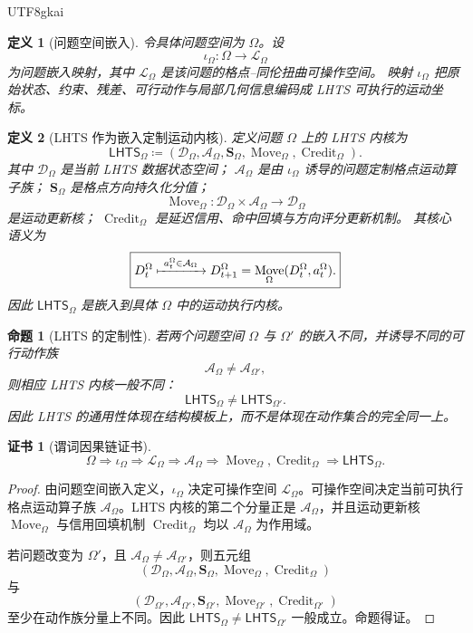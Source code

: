 \documentclass[12pt]{article}
\newtheorem{definition}{定义}[section]
\newtheorem{proposition}{命题}[section]
\newtheorem{Certificate}{证书}[section]
\newcommand{\LHTS}{\ensuremath{\mathsf{LHTS}}}
\newcommand{\DefEq}{\coloneqq}
\DeclareMathOperator{\Move}{Move}
\DeclareMathOperator{\Credit}{Credit}
\begin{document}
\begin{CJK*}{UTF8}{gkai}
\begin{definition}[问题空间嵌入]
令具体问题空间为 \(\Omega\)。设
\[
\iota_\Omega:\Omega\longrightarrow\mathcal L_\Omega
\]
为问题嵌入映射，其中 \(\mathcal L_\Omega\) 是该问题的格点--同伦扭曲可操作空间。
映射 \(\iota_\Omega\) 把原始状态、约束、残差、可行动作与局部几何信息编码成
LHTS 可执行的运动坐标。
\end{definition}

\begin{definition}[LHTS 作为嵌入定制运动内核]
定义问题 \(\Omega\) 上的 LHTS 内核为
\[
\boxed{
\LHTS_\Omega
\DefEq
(\mathcal D_\Omega,\mathcal A_\Omega,\mathbf S_\Omega,
\Move_\Omega,\Credit_\Omega).
}
\]
其中 \(\mathcal D_\Omega\) 是当前 LHTS 数据状态空间；
\(\mathcal A_\Omega\) 是由 \(\iota_\Omega\) 诱导的问题定制格点运动算子族；
\(\mathbf S_\Omega\) 是格点方向持久化分值；
\[
\Move_\Omega:
\mathcal D_\Omega\times\mathcal A_\Omega
\longrightarrow
\mathcal D_\Omega
\]
是运动更新核；
\(\Credit_\Omega\) 是延迟信用、命中回填与方向评分更新机制。
其核心语义为
\[
\boxed{
D_t^\Omega
\xmapsto{\ a_t^\Omega\in\mathcal A_\Omega\ }
D_{t+1}^\Omega
=
\Move_\Omega(D_t^\Omega,a_t^\Omega).
}
\]
因此 \(\LHTS_\Omega\) 是嵌入到具体 \(\Omega\) 中的运动执行内核。
\end{definition}

\begin{proposition}[LHTS 的定制性]
若两个问题空间 \(\Omega\) 与 \(\Omega'\) 的嵌入不同，并诱导不同的可行动作族
\[
\mathcal A_\Omega\ne\mathcal A_{\Omega'},
\]
则相应 LHTS 内核一般不同：
\[
\LHTS_\Omega\ne\LHTS_{\Omega'}.
\]
因此 LHTS 的通用性体现在结构模板上，而不是体现在动作集合的完全同一上。
\end{proposition}

\begin{Certificate}[谓词因果链证书]
\[
\boxed{
\Omega
\Rightarrow
\iota_\Omega
\Rightarrow
\mathcal L_\Omega
\Rightarrow
\mathcal A_\Omega
\Rightarrow
\Move_\Omega,\Credit_\Omega
\Rightarrow
\LHTS_\Omega.
}
\]
\end{Certificate}

\begin{proof}
由问题空间嵌入定义，\(\iota_\Omega\) 决定可操作空间
\(\mathcal L_\Omega\)。可操作空间决定当前可执行格点运动算子族
\(\mathcal A_\Omega\)。LHTS 内核的第二个分量正是
\(\mathcal A_\Omega\)，并且运动更新核
\(\Move_\Omega\) 与信用回填机制 \(\Credit_\Omega\) 均以
\(\mathcal A_\Omega\) 为作用域。

若问题改变为 \(\Omega'\)，且
\(\mathcal A_\Omega\ne\mathcal A_{\Omega'}\)，则五元组
\[
(\mathcal D_\Omega,\mathcal A_\Omega,\mathbf S_\Omega,\Move_\Omega,\Credit_\Omega)
\]
与
\[
(\mathcal D_{\Omega'},\mathcal A_{\Omega'},\mathbf S_{\Omega'},
\Move_{\Omega'},\Credit_{\Omega'})
\]
至少在动作族分量上不同。因此
\(\LHTS_\Omega\ne\LHTS_{\Omega'}\) 一般成立。命题得证。
\end{proof}


\end{CJK*}
\end{document}
